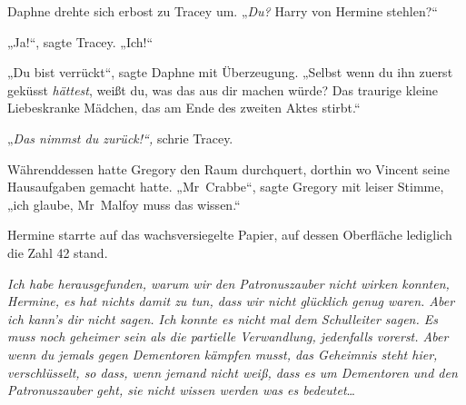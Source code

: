 Daphne drehte sich erbost zu Tracey um. „\emph{Du?} Harry von Hermine stehlen?“

„Ja!“, sagte Tracey. „Ich!“

„Du bist verrückt“, sagte Daphne mit Überzeugung. „Selbst wenn du ihn zuerst geküsst \emph{hättest}, weißt du, was das aus dir machen würde? Das traurige kleine Liebeskranke Mädchen, das am Ende des zweiten Aktes stirbt.“

„\emph{Das nimmst du zurück!“,} schrie Tracey.

Währenddessen hatte Gregory den Raum durchquert, dorthin wo Vincent seine Hausaufgaben gemacht hatte. „Mr~Crabbe“, sagte Gregory mit leiser Stimme, „ich glaube, Mr~Malfoy muss das wissen.“


Hermine starrte auf das wachsversiegelte Papier, auf dessen Oberfläche lediglich die Zahl 42 stand.

\emph{Ich habe herausgefunden, warum wir den Patronuszauber nicht wirken konnten, Hermine, es hat nichts damit zu tun, dass wir nicht glücklich genug waren. Aber ich kann's dir nicht sagen. Ich konnte es nicht mal dem Schulleiter sagen. Es muss noch geheimer sein als die partielle Verwandlung, jedenfalls vorerst. Aber wenn du jemals gegen Dementoren kämpfen musst, das Geheimnis steht hier, verschlüsselt, so dass, wenn jemand nicht weiß, dass es um Dementoren und den Patronuszauber geht, sie nicht wissen werden was es bedeutet}…

